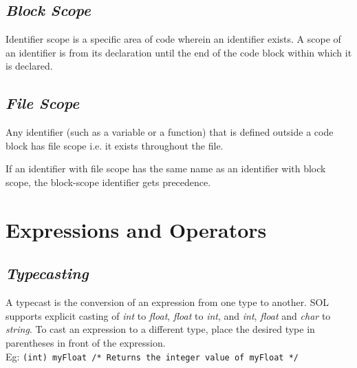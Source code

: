 \documentclass[letterpaper,12pt]{article}
\begin{document}
	\subsection{\textit{Block Scope}}
	Identifier scope is a specific area of code wherein an identifier exists. A scope of an identifier is from its declaration until the end of the code block within which it is declared.
	
	\subsection{\textit{File Scope}}
	Any identifier (such as a variable or a function) that is defined outside a code block has file scope i.e. it exists throughout the file.

	If an identifier with file scope has the same name as an identifier with block scope, the block-scope identifier gets precedence.

\section{Expressions and Operators}
	\subsection{\textit{Typecasting}}
	A typecast is the conversion of an expression from one type to another. SOL supports explicit casting of \textit{int} to \textit{float}, \textit{float} to \textit{int}, and \textit{int}, \textit{float} and \textit{char} to \textit{string}. To cast an expression to a different type, place the desired type in parentheses in front of the expression. \\
	Eg: \texttt{(int) myFloat /* Returns the integer value of myFloat */}
	
\end{document}
